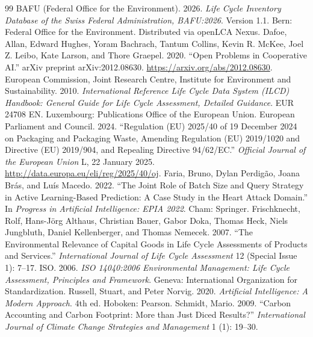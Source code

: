 \documentclass{article}
\begin{document}
\begin{thebibliography}{99}
\scriptsize
\setlength{\itemsep}{0pt}
BAFU (Federal Office for the Environment). 2026. \emph{Life Cycle Inventory Database of the Swiss Federal Administration, BAFU:2026}. Version 1.1. Bern: Federal Office for the Environment. Distributed via openLCA Nexus.
Dafoe, Allan, Edward Hughes, Yoram Bachrach, Tantum Collins, Kevin R. McKee, Joel Z. Leibo, Kate Larson, and Thore Graepel. 2020. ``Open Problems in Cooperative AI.'' arXiv preprint arXiv:2012.08630. \url{https://arxiv.org/abs/2012.08630}.
European Commission, Joint Research Centre, Institute for Environment and Sustainability. 2010. \emph{International Reference Life Cycle Data System (ILCD) Handbook: General Guide for Life Cycle Assessment, Detailed Guidance}. EUR 24708 EN. Luxembourg: Publications Office of the European Union.
European Parliament and Council. 2024. ``Regulation (EU) 2025/40 of 19 December 2024 on Packaging and Packaging Waste, Amending Regulation (EU) 2019/1020 and Directive (EU) 2019/904, and Repealing Directive 94/62/EC.'' \emph{Official Journal of the European Union} L, 22 January 2025. \url{http://data.europa.eu/eli/reg/2025/40/oj}.
Faria, Bruno, Dylan Perdig\~ao, Joana Br\'as, and Lu\'is Macedo. 2022. ``The Joint Role of Batch Size and Query Strategy in Active Learning-Based Prediction: A Case Study in the Heart Attack Domain.'' In \emph{Progress in Artificial Intelligence: EPIA 2022}. Cham: Springer.
Frischknecht, Rolf, Hans-J\"org Althaus, Christian Bauer, Gabor Doka, Thomas Heck, Niels Jungbluth, Daniel Kellenberger, and Thomas Nemecek. 2007. ``The Environmental Relevance of Capital Goods in Life Cycle Assessments of Products and Services.'' \emph{International Journal of Life Cycle Assessment} 12 (Special Issue 1): 7--17.
ISO. 2006. \emph{ISO 14040:2006 Environmental Management: Life Cycle Assessment, Principles and Framework}. Geneva: International Organization for Standardization.
Russell, Stuart, and Peter Norvig. 2020. \emph{Artificial Intelligence: A Modern Approach}. 4th ed. Hoboken: Pearson.
Schmidt, Mario. 2009. ``Carbon Accounting and Carbon Footprint: More than Just Diced Results?'' \emph{International Journal of Climate Change Strategies and Management} 1 (1): 19--30.

\end{thebibliography}
\end{document}

